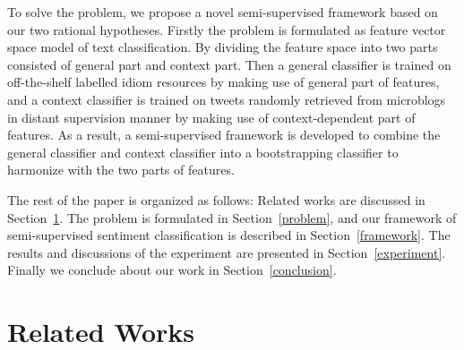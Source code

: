 \documentclass{llncs}
\begin{document}
To solve the problem, we propose a novel semi-supervised framework based on our two rational hypotheses.
Firstly the problem is formulated as feature vector space model of text classification. 
By dividing the feature space into two parts consisted of general part and context part. 
Then a general classifier is trained on off-the-shelf labelled idiom resources by making use of general part of features, and a context classifier is trained on tweets randomly retrieved from microblogs in distant supervision manner by making use of context-dependent part of features. 
As a result, a semi-supervised framework is developed to combine the general classifier and context classifier into a bootstrapping classifier to harmonize with the two parts of features. 

The rest of the paper is organized as follows: Related works are discussed in Section~\ref{related}. The problem is formulated in Section~\ref{problem}, and our framework of semi-supervised sentiment classification is described in Section~\ref{framework}. The results and discussions of the experiment are presented in Section~\ref{experiment}. Finally we conclude about our work in Section~\ref{conclusion}.

\section{Related Works}
\label{related}
\end{document}
